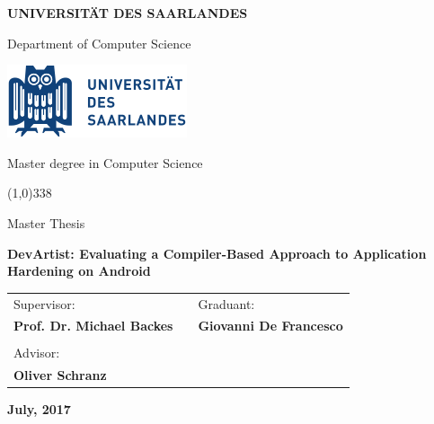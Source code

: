 \begin{titlepage}
  \pagestyle{empty}

  \begin{center}
    {\bfseries\Large {\huge U}NIVERSIT{\"A}T DES {\huge S}AARLANDES}

    \vspace{0.2cm}

    {\large Department of Computer Science}

    \vspace{0.5cm}

    \begin{center}
      \includegraphics{img/logo_uds.png}
    \end{center}

    \vspace{0.5cm}

    {\Large Master degree in Computer Science}

    \vspace{0.2cm}
    \line(1,0){338}
    \vspace{0.5cm}

    {\Large Master Thesis}

    \vspace{2.0cm}

    {\Large \bfseries {DevArtist: Evaluating a Compiler-Based Approach to Application Hardening on Android}}

    \vspace{0.3cm}
    

    \large
    \begin{center}
      \begin{tabular}{lcl}
        Supervisor: & \hspace{4cm} &  \hspace{1.5cm} Graduant: \\
        {\bfseries Prof. Dr. Michael Backes} & \hspace{2cm} & {\bfseries Giovanni De Francesco } \\ \\
        Advisor: \\ {\bfseries Oliver Schranz}
      \end{tabular}
    \end{center}
    \vspace{2.0cm}

    {\large \bfseries July, 2017}
    \vfill

  \end{center}

\end{titlepage}

